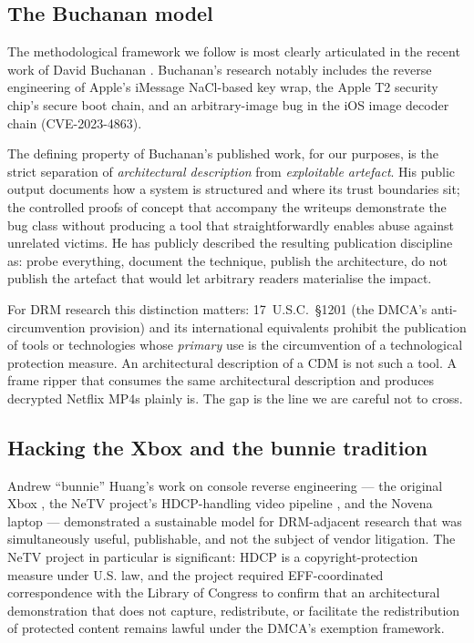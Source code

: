 \documentclass[11pt,letterpaper]{article}
\begin{document}
\subsection{The Buchanan model}
\label{sec:ante-buchanan}

The methodological framework we follow is most clearly articulated
in the recent work of David Buchanan
\cite{buchanan-blog, buchanan-imessage, buchanan-t2}. Buchanan's
research notably includes the reverse engineering of Apple's
iMessage NaCl-based key wrap, the Apple T2 security chip's secure
boot chain, and an arbitrary-image bug in the iOS image decoder
chain (CVE-2023-4863).

The defining property of Buchanan's published work, for our
purposes, is the strict separation of \emph{architectural
description} from \emph{exploitable artefact}. His public output
documents how a system is structured and where its trust boundaries
sit; the controlled proofs of concept that accompany the writeups
demonstrate the bug class without producing a tool that
straightforwardly enables abuse against unrelated victims. He has
publicly described the resulting publication discipline as: probe
everything, document the technique, publish the architecture, do
not publish the artefact that would let arbitrary readers
materialise the impact.

For DRM research this distinction matters: 17~U.S.C.~§1201
(the DMCA's anti-circumvention provision) and its international
equivalents prohibit the publication of tools or technologies whose
\emph{primary} use is the circumvention of a technological
protection measure. An architectural description of a CDM is not
such a tool. A frame ripper that consumes the same architectural
description and produces decrypted Netflix MP4s plainly is. The
gap is the line we are careful not to cross.

\subsection{Hacking the Xbox and the bunnie tradition}
\label{sec:ante-bunnie}

Andrew ``bunnie'' Huang's work on console reverse engineering ---
the original Xbox \cite{bunnie-xbox-book}, the NeTV project's
HDCP-handling video pipeline \cite{bunnie-nettv}, and the Novena
laptop --- demonstrated a sustainable model for DRM-adjacent
research that was simultaneously useful, publishable, and not the
subject of vendor litigation. The NeTV project in particular is
significant: HDCP is a copyright-protection measure under U.S.
law, and the project required EFF-coordinated correspondence with
the Library of Congress to confirm that an architectural
demonstration that does not capture, redistribute, or facilitate
the redistribution of protected content remains lawful under the
DMCA's exemption framework.
\end{document}
